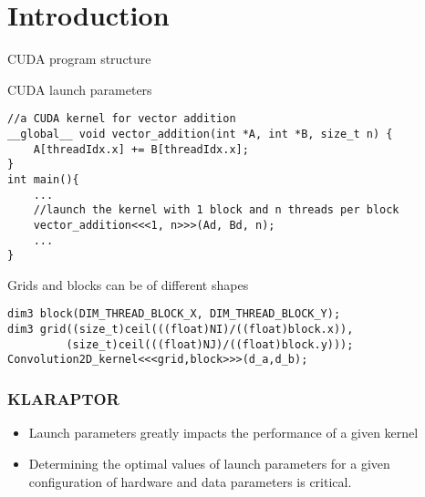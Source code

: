 \section{Introduction}
\begin{frame}[fragile]{CUDA program structure}
	\begin{block}{CUDA launch parameters}
		\begin{verbatim}
//a CUDA kernel for vector addition
__global__ void vector_addition(int *A, int *B, size_t n) {
    A[threadIdx.x] += B[threadIdx.x];
}
int main(){
    ...
    //launch the kernel with 1 block and n threads per block
    vector_addition<<<1, n>>>(Ad, Bd, n);
    ...
}			
		\end{verbatim}
	\end{block}
	\begin{block}{Grids and blocks can be of different shapes}
		\begin{verbatim}
dim3 block(DIM_THREAD_BLOCK_X, DIM_THREAD_BLOCK_Y);
dim3 grid((size_t)ceil(((float)NI)/((float)block.x)),
         (size_t)ceil(((float)NJ)/((float)block.y)));
Convolution2D_kernel<<<grid,block>>>(d_a,d_b);
		\end{verbatim}
	\end{block}
\end{frame}

\begin{frame}
    \frametitle{KLARAPTOR}
    \begin{block}{}
        \begin{itemize}
			\item Launch parameters greatly impacts the performance of a given kernel
			\item Determining the optimal values of launch parameters for a given configuration of hardware and data parameters is critical.
		\end{itemize}
        
    \end{block}
\end{frame}
